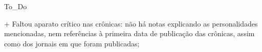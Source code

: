 To_Do

+ Faltou aparato crítico nas crônicas: não há notas explicando as personalidades mencionadas, nem referências à primeira data de publicação das crônicas, assim como dos jornais em que foram publicadas;